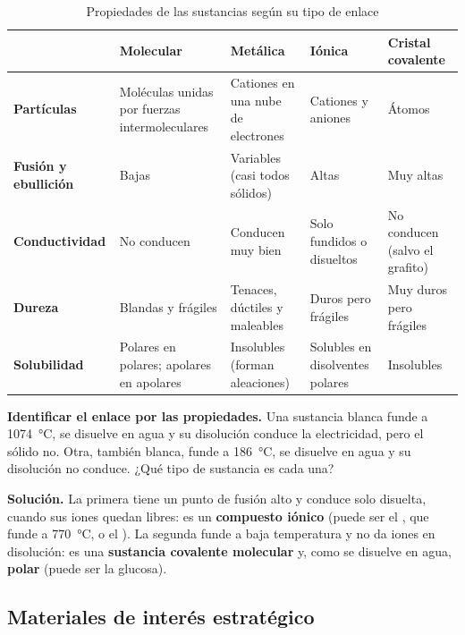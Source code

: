 \begin{table}[H]
    \centering
    \caption{Propiedades de las sustancias según su tipo de enlace}
    \vspace{-5pt}
    \small
    \begin{tabular}{@{}L{2.25cm}L{2.7cm}L{2.7cm}L{2.7cm}L{2.7cm}@{}}
        \toprule
        & \textbf{Molecular} & \textbf{Metálica} & \textbf{Iónica} & \textbf{Cristal covalente} \\
        \midrule
        \textbf{Partículas} & Moléculas unidas por fuerzas intermoleculares & Cationes en una nube de electrones & Cationes y
        aniones & Átomos \\[3pt]
        \textbf{Fusión y ebullición} & Bajas & Variables (casi todos sólidos) & Altas & Muy altas \\[3pt]
        \textbf{Conductividad} & No conducen & Conducen muy bien & Solo fundidos o disueltos & No conducen (salvo el grafito) \\[3pt]
        \textbf{Dureza} & Blandas y frágiles & Tenaces, dúctiles y maleables & Duros pero frágiles & Muy duros pero frágiles \\[3pt]
        \textbf{Solubilidad} & Polares en polares; apolares en apolares & Insolubles (forman aleaciones) & Solubles en disolventes
        polares & Insolubles \\
        \bottomrule
    \end{tabular}
    \label{tab:ud4-propiedades}
\end{table}

\begin{example}
    \textbf{Identificar el enlace por las propiedades.} Una sustancia blanca funde a \qty{1074}{\degreeCelsius}, se disuelve en
    agua y su disolución conduce la electricidad, pero el sólido no. Otra, también blanca, funde a \qty{186}{\degreeCelsius}, se
    disuelve en agua y su disolución no conduce. ¿Qué tipo de sustancia es cada una?

    \textbf{Solución.} La primera tiene un punto de fusión alto y conduce solo disuelta, cuando sus iones quedan libres: es un
    \textbf{compuesto iónico} (puede ser el , que funde a \qty{770}{\degreeCelsius}, o el ). La segunda funde a
    baja temperatura y no da iones en disolución: es una \textbf{sustancia covalente molecular} y, como se disuelve en agua,
    \textbf{polar} (puede ser la glucosa).
\end{example}

\subsection{Materiales de interés estratégico}

